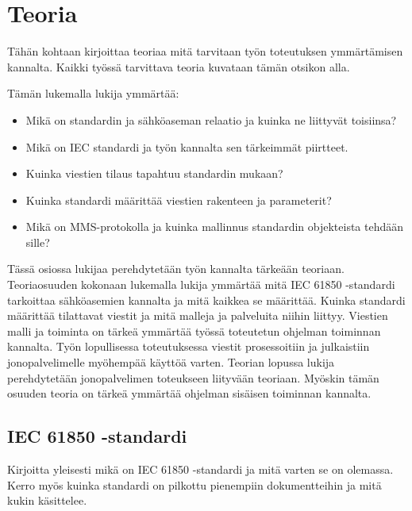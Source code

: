 \chapter{Teoria}
\label{ch:teoria}
\begin{it}
	Tähän kohtaan kirjoittaa teoriaa mitä tarvitaan työn toteutuksen ymmärtämisen kannalta. Kaikki työssä tarvittava teoria kuvataan tämän otsikon alla.

	Tämän lukemalla lukija ymmärtää:
	\begin{itemize}
		\item Mikä on standardin ja sähköaseman relaatio ja kuinka ne liittyvät toisiinsa?
		\item Mikä on IEC standardi ja työn kannalta sen tärkeimmät piirtteet.
		\item Kuinka viestien tilaus tapahtuu standardin mukaan?
		\item Kuinka standardi määrittää viestien rakenteen ja parameterit?
		\item Mikä on MMS-protokolla ja kuinka mallinnus standardin objekteista tehdään sille?
	\end{itemize}
\end{it}

Tässä osiossa lukijaa perehdytetään työn kannalta tärkeään teoriaan. Teoriaosuuden kokonaan lukemalla lukija ymmärtää mitä IEC 61850 -standardi tarkoittaa sähköasemien kannalta ja mitä kaikkea se määrittää. Kuinka standardi määrittää tilattavat viestit ja mitä malleja ja palveluita niihin liittyy. Viestien malli ja toiminta on tärkeä ymmärtää työssä toteutetun ohjelman toiminnan kannalta. Työn lopullisessa toteutuksessa viestit prosessoitiin ja julkaistiin jonopalvelimelle myöhempää käyttöä varten. Teorian lopussa lukija perehdytetään jonopalvelimen toteukseen liityvään teoriaan. Myöskin tämän osuuden teoria on tärkeä ymmärtää ohjelman sisäisen toiminnan kannalta.

\section{IEC 61850 -standardi}
\begin{it}
	Kirjoitta yleisesti mikä on IEC 61850 -standardi ja mitä varten se on olemassa. Kerro myös kuinka standardi on pilkottu pienempiin dokumentteihin ja mitä kukin käsittelee.
\end{it}

